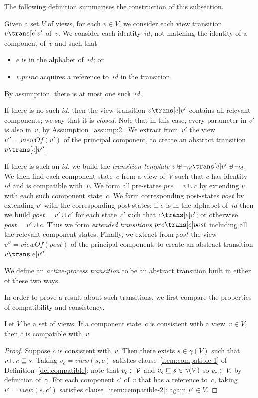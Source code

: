 The following definition summarises the construction of this subsection.
%
\begin{definition}
\label{def:active-process-transition}
Given a set $V$ of views, for each $v \in V$, we consider each view transition
$v \trans[e] v'$ of~$v$.
%
We consider each identity~$id$, not matching the identity of a component
of~$v$ and such that
%
\begin{itemize}
\item $e$ is in the alphabet of~$id$; or

\item $v.princ$ acquires a reference to~$id$ in the transition.
\end{itemize}
%
By assumption, there is at most one such~$id$.

If there is no such $id$, then the view transition $v \trans[e] v'$ contains
all relevant components; we say that it is \emph{closed}.  Note that in this
case, every parameter in $v'$ is also in~$v$, by Assumption~\ref{assump:2}.
We extract from~$v'$ the view~$v'' = viewOf(v')$ of the principal component,
to create an abstract transition $v \trans[e] v''$.

If there is such an $id$, we build the \emph{transition template} $v \uplus
\hole{id} \trans[e] v' \uplus \hole{id}$.  We then find each component
state~$c$ from a view of~$V$ such that $c$ has identity~$id$ and is compatible
with~$v$.  We form all pre-states $pre = v \uplus c$ by extending $v$ with
each such component state~$c$.  We form corresponding post-states $post$ by
extending $v'$ with the corresponding post-states: if $e$ is in the alphabet
of~$id$ then we build $post = v' \uplus c'$ for each state~$c'$ such that $c
\trans[e] c'$; or otherwise $post = v' \uplus c$.  Thus we form \emph{extended
  transitions} $pre \trans[e] post$ including all the relevant component
states.  Finally, we extract from $post$ the view~$v'' = viewOf(post)$ of the
principal component, to create an abstract transition $v \trans[e] v''$.

We define an \emph{active-process transition} to be an abstract transition
built in either of these two ways.
\end{definition}


In order to prove a result about such transitions, we first compare the
properties of compatibility and consistency.
%
\begin{lemma}
\label{lem:consistent-implies-compatible}
Let $V$ be a set of views.
If a component state~$c$ is consistent with a view~$v \in V$, then
$c$ is compatible with~$v$. 
\end{lemma}
%
\begin{proof}
Suppose $c$ is consistent with~$v$.  Then there exists $s \in \gamma(V)$ such
that $v \uplus c \sqsubseteq s$.  Taking $v_c = view(s, c)$ satisfies
clause~\ref{item:compatible-1} of Definition~\ref{def:compatible}: note that
$v_c \in \mathcal{V}$ and $v_c \sqsubseteq s \in \gamma(V)$ so $v_c \in V$, by definition
of~$\gamma$.  For each component $c'$ of~$v$ that has a reference to~$c$,
taking $v' = view(s,c')$ satisfies clause~\ref{item:compatible-2}: again $v'
\in V$.
\end{proof}

